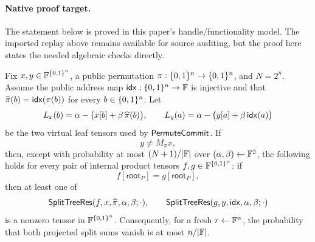\paragraph{Native proof target.}
The statement below is proved in this paper's handle/functionality model.  The
imported replay above remains available for source auditing, but the proof here
states the needed algebraic checks directly.

\begin{lemma}
\label{lem:split-tree-openinner-soundness}
Fix \(x,y\in\mathbb{F}^{\{0,1\}^n}\), a public permutation \(\pi:\{0,1\}^n\to\{0,1\}^n\), and
\(N=2^n\).  Assume the public address map \(\mathsf{idx}:\{0,1\}^n\to\mathbb{F}\) is injective and
that \(\widehat\pi(b)=\mathsf{idx}(\pi(b))\) for every \(b\in\{0,1\}^n\).  Let
\[
  L_x(b)=\alpha-\bigl(x[b]+\beta\,\widehat\pi(b)\bigr),
  \qquad
  L_y(a)=\alpha-\bigl(y[a]+\beta\,\mathsf{idx}(a)\bigr)
\]
be the two virtual leaf tensors used by \(\mathsf{PermuteCommit}\).  If
\[
  y\ne M_\pi x,
\]
then, except with probability at most \((N+1)/|\mathbb{F}|\) over
\((\alpha,\beta)\leftarrow\mathbb{F}^2\), the following holds for every pair of
internal product tensors \(f,g\in\mathbb{F}^{\{0,1\}^n}\): if
\[
  f[\mathsf{root}_P]=g[\mathsf{root}_P],
\]
then at least one of
\[
  \mathsf{SplitTreeRes}(f,x,\widehat\pi,\alpha,\beta;\cdot),
  \qquad
  \mathsf{SplitTreeRes}(g,y,\mathsf{idx},\alpha,\beta;\cdot)
\]
is a nonzero tensor in \(\mathbb{F}^{\{0,1\}^n}\).  Consequently, for a fresh
\(r\leftarrow\mathbb{F}^n\), the probability that both projected split sums vanish is
at most \(n/|\mathbb{F}|\).
\end{lemma}

